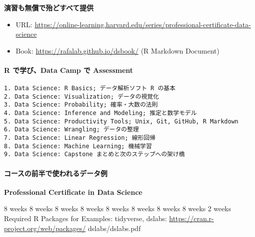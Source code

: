 \documentclass[
]{book}
\providecommand{\tightlist}{%
  \setlength{\itemsep}{0pt}\setlength{\parskip}{0pt}}
\theoremstyle{definition}
\theoremstyle{definition}
\theoremstyle{definition}
\theoremstyle{definition}
\theoremstyle{remark}
\begin{document}
\textbf{演習も無償で殆どすべて提供}

\begin{itemize}
\tightlist
\item
  URL: \url{https://online-learning.harvard.edu/series/professional-certificate-data-science}
\item
  Book: \url{https://rafalab.github.io/dsbook/} (R Markdown Document)
\end{itemize}

\hypertarget{r-ux3067ux5b66ux3073data-camp-ux3067-assessment}{%
\paragraph{R で学び、Data Camp で Assessment}\label{r-ux3067ux5b66ux3073data-camp-ux3067-assessment}}

\begin{verbatim}
1. Data Science: R Basics; データ解析ソフト R の基本
2. Data Science: Visualization; データの視覚化
3. Data Science: Probability; 確率・大数の法則
4. Data Science: Inference and Modeling; 推定と数学モデル
5. Data Science: Productivity Tools; Unix, Git, GitHub, R Markdown 
6. Data Science: Wrangling; データの整理
7. Data Science: Linear Regression; 線形回帰
8. Data Science: Machine Learning; 機械学習
9. Data Science: Capstone まとめと次のステップへの架け橋
\end{verbatim}

\hypertarget{ux30b3ux30fcux30b9ux306eux524dux534aux3067ux4f7fux308fux308cux308bux30c7ux30fcux30bfux4f8b}{%
\paragraph{コースの前半で使われるデータ例}\label{ux30b3ux30fcux30b9ux306eux524dux534aux3067ux4f7fux308fux308cux308bux30c7ux30fcux30bfux4f8b}}

\textbf{Professional Certificate in Data Science}

8 weeks 8 weeks 8 weeks 8 weeks 8 weeks 8 weeks 8 weeks 8 weeks 2 weeks
Required R Packages for Examples: tidyverse, dslabs: \url{https://cran.r-project.org/web/packages/} dslabs/dslabs.pdf
\end{document}
